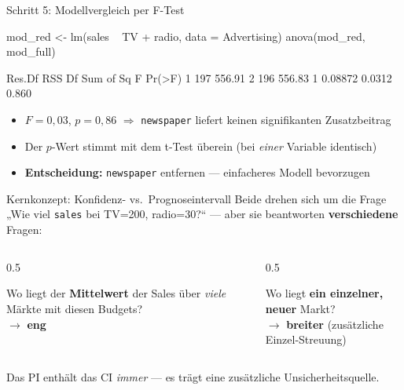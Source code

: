 \documentclass[aspectratio=169,11pt]{beamer}
\begin{document}
\begin{frame}[fragile]{Schritt 5: Modellvergleich per F-Test}
\begin{rcode}
mod_red  <- lm(sales ~ TV + radio, data = Advertising)
anova(mod_red, mod_full)
\end{rcode}
\begin{rout}
  Res.Df    RSS Df Sum of Sq      F Pr(>F)
1    197 556.91
2    196 556.83  1   0.08872 0.0312  0.860
\end{rout}
\vspace{0.2cm}
\begin{itemize}
  \item $F = 0{,}03$, $p = 0{,}86$ $\Rightarrow$ \texttt{newspaper} liefert
        \alert{keinen} signifikanten Zusatzbeitrag
  \item Der $p$-Wert stimmt mit dem t-Test überein (bei \emph{einer}
        Variable identisch)
  \item \textbf{Entscheidung:} \texttt{newspaper} entfernen --- einfacheres
        Modell bevorzugen
\end{itemize}
\end{frame}

\begin{frame}{Kernkonzept: Konfidenz- vs.\ Prognoseintervall}
Beide drehen sich um die Frage „Wie viel \texttt{sales} bei TV=200,
radio=30?{}`` --- aber sie beantworten \textbf{verschiedene} Fragen:

\vspace{0.2cm}
\begin{columns}[T]
\begin{column}{0.5\textwidth}
\begin{konzept}[Konfidenzintervall (CI)]
Wo liegt der \textbf{Mittelwert} der Sales über \emph{viele} Märkte mit
diesen Budgets? \\ $\rightarrow$ \textbf{eng}
\end{konzept}
\end{column}
\begin{column}{0.5\textwidth}
\begin{konzept}[Prognoseintervall (PI)]
Wo liegt \textbf{ein einzelner, neuer} Markt? \\
$\rightarrow$ \textbf{breiter} (zusätzliche Einzel-Streuung)
\end{konzept}
\end{column}
\end{columns}
\vspace{0.3cm}
\centering
Das PI enthält das CI \emph{immer} --- es trägt eine zusätzliche
Unsicherheitsquelle.
\end{frame}
\end{document}
